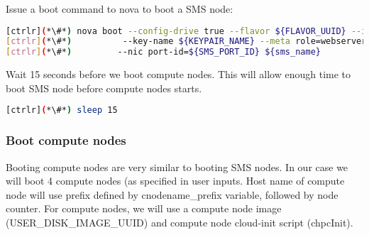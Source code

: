 	Issue a boot command to nova to boot a SMS node:


\begin{lstlisting}[language=bash,keywords={}]
[ctrlr](*\#*) nova boot --config-drive true --flavor ${FLAVOR_UUID} --image ${SMS_DISK_IMAGE_UUID} \
[ctrlr](*\#*)          --key-name ${KEYPAIR_NAME} --meta role=webservers --user-data=$chpcSMSInit \
[ctrlr](*\#*)         --nic port-id=${SMS_PORT_ID} ${sms_name}
\end{lstlisting} 

	Wait 15 seconds before we boot compute nodes. This will allow enough time to boot SMS node before compute nodes starts. 


\begin{lstlisting}[language=bash,keywords={}]
[ctrlr](*\#*) sleep 15
\end{lstlisting} 

\newpage
\subsubsection{Boot compute nodes}

	Booting compute nodes are very similar to booting SMS nodes. In our case we will boot 4 compute nodes (as specified in user inputs. Host name of compute node will use prefix defined by cnodename\_prefix variable, followed by node counter. For compute nodes, we will use a compute node image (USER\_DISK\_IMAGE\_UUID) and compute node cloud-init script (chpcInit). 


